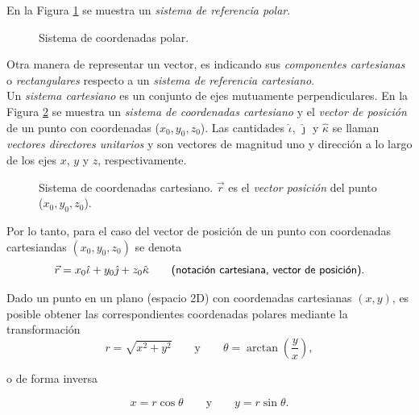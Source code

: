 En la Figura \ref{fig:polar} se muestra un \textit{sistema de referencia polar}.\\[.35cm]

\begin{figure}[!ht]
\caption{Sistema de coordenadas polar.}
\label{fig:polar}
\end{figure}


Otra manera de representar un vector, es indicando sus \textit{componentes cartesianas} o \textit{rectangulares} respecto a un \textit{sistema de referencia cartesiano}. \\[.35cm]

 Un \textit{sistema cartesiano} es un conjunto de ejes mutuamente perpendiculares. En la Figura \ref{fig:sist} se muestra un \textit{sistema de coordenadas cartesiano} y el \textit{vector de posici\'on} de un punto con coordenadas ($x_0,y_0,z_0$). Las cantidades $\hat{\iota}$, $\hat{\jmath}$ y $\hat{\kappa}$ se llaman \textit{vectores directores unitarios} y son vectores de magnitud uno y direcci\'on a lo largo de los ejes $x$, $y$ y $z$, respectivamente.  \\[.35cm]
 
 \begin{figure}[!ht]
\begin{center}

\caption{Sistema de coordenadas cartesiano. $\vec{r}$  es el \textit{vector posici\'on} del punto ($x_0,y_0,z_0$).}
\label{fig:sist}
\end{center}
\end{figure}

 
 Por lo tanto, para el caso del vector de posici\'on de un punto con coordenadas cartesiandas $(x_{0},y_{0},z_{0})$ se denota 
$$\vec{r}=x_{0}\hat{\iota}+y_{0}\hat{\jmath}+z_{0}\hat{\kappa} \qquad \mbox{\textsf{(notaci\'on cartesiana, vector de posici\'on).}} $$



Dado un punto en un plano (espacio 2D) con coordenadas cartesianas $(x,y)$, es posible obtener las correspondientes coordenadas polares mediante la transformaci\'on
$$ r=\sqrt{x^2+y^2} \qquad \mbox{y} \qquad \theta= \arctan \left( \frac{y}{x}\right), $$

o de forma inversa

$$x=r \cos \theta \qquad \mbox{y} \qquad y=r \sin \theta.$$

